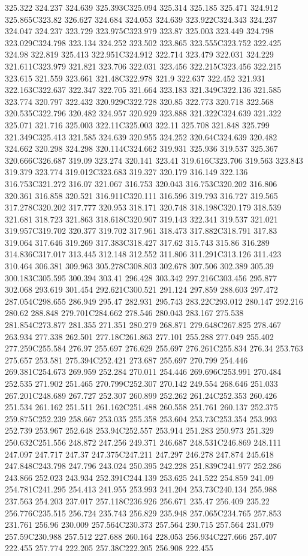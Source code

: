 325.322 324.237 324.639 325.393C325.094 325.314 325.185 325.471 324.912 325.865C323.82 326.627 324.684 324.053 324.639 323.922C324.343 324.237 324.047 324.237 323.729 323.975C323.979 323.87 325.003 323.449 324.798 323.029C324.798 323.134 324.252 323.502 323.865 323.555C323.752 322.425 324.98 322.819 325.413 322.951C324.912 322.714 323.479 322.031 324.229 321.611C323.979 321.821 323.706 322.031 323.456 322.215C323.456 322.215 323.615 321.559 323.661 321.48C322.978 321.9 322.637 322.452 321.931 322.163C322.637 322.347 322.705 321.664 323.183 321.349C322.136 321.585 323.774 320.797 322.432 320.929C322.728 320.85 322.773 320.718 322.568 320.535C322.796 320.482 324.957 320.929 323.888 321.322C324.639 321.322 325.071 321.716 325.003 322.11C325.003 322.11 325.708 321.848 325.799 321.349C325.413 321.585 324.639 320.955 324.252 320.64C324.639 320.482 324.662 320.298 324.298 320.114C324.662 319.931 325.936 319.537 325.367 320.666C326.687 319.09 323.274 320.141 323.41 319.616C323.706 319.563 323.843 319.379 323.774 319.012C323.683 319.327 320.179 316.149 322.136 316.753C321.272 316.07 321.067 316.753 320.043 316.753C320.202 316.806 320.361 316.858 320.521 316.911C320.111 316.596 319.793 316.727 319.565 317.278C320.202 317.777 320.953 318.171 320.748 318.198C320.179 318.539 321.681 318.723 321.863 318.618C320.907 319.143 322.341 319.537 321.021 319.957C319.702 320.377 319.702 317.961 318.473 317.882C318.791 317.83 319.064 317.646 319.269 317.383C318.427 317.62 315.743 315.86 316.289 314.836C317.017 313.445 312.148 312.552 311.806 311.291C313.126 311.423 310.464 306.381 309.963 305.278C308.803 302.678 307.506 302.389 305.39 300.183C305.595 300.394 303.41 296.428 303.342 297.216C303.456 295.877 302.068 293.619 301.454 292.621C300.521 291.124 297.859 288.603 297.472 287.054C298.655 286.949 295.47 282.931 295.743 283.22C293.012 280.147 292.216 280.62 288.848 279.701C284.662 278.546 280.043 283.167 275.538 281.854C273.877 281.355 271.351 280.279 268.871 279.648C267.825 278.467 263.934 277.338 262.501 277.18C261.863 277.101 255.288 277.049 255.402 277.259C255.584 276.97 255.697 276.629 255.697 276.261C255.834 276.34 253.763 275.657 253.581 275.394C252.421 273.687 255.697 270.799 254.446 269.381C254.673 269.959 252.284 270.011 254.446 269.696C253.991 270.484 252.535 271.902 251.465 270.799C252.307 270.142 249.554 268.646 251.033 267.201C248.689 267.727 252.307 260.899 252.262 261.24C252.353 260.426 251.534 261.162 251.511 261.162C251.488 260.558 251.761 260.137 252.375 259.875C252.239 258.667 253.035 255.358 253.604 253.73C253.354 253.993 252.739 253.967 252.648 253.94C252.557 253.914 251.283 250.973 251.329 250.632C251.556 248.872 247.256 249.371 246.687 248.531C246.869 248.111 247.097 247.717 247.37 247.375C247.211 247.297 246.278 247.874 245.618 247.848C243.798 247.796 243.024 250.395 242.228 251.839C241.977 252.286 243.866 252.023 243.934 252.391C244.139 253.625 241.522 254.859 241.09 254.781C241.295 254.413 241.955 253.993 241.204 253.73C240.134 255.988 237.563 254.203 237.017 257.118C236.926 256.671 235.47 256.409 235.22 256.776C235.515 256.724 235.743 256.829 235.948 257.065C234.765 257.853 231.761 256.96 230.009 257.564C230.373 257.564 230.715 257.564 231.079 257.59C230.988 257.512 227.688 260.164 228.053 256.934C227.666 257.407 222.455 257.774 222.205 257.38C222.205 256.908 222.455 